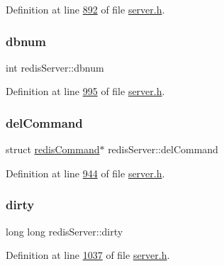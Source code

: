 Definition at line \hyperlink{server_8h_source_l00892}{892} of file \hyperlink{server_8h_source}{server.\+h}.

\mbox{\label{structredisServer_a62d9b4dfd9fa2999fdeafb9756759e40}} 
\subsubsection{\texorpdfstring{dbnum}{dbnum}}
{\footnotesize\ttfamily int redis\+Server\+::dbnum}



Definition at line \hyperlink{server_8h_source_l00995}{995} of file \hyperlink{server_8h_source}{server.\+h}.

\mbox{\label{structredisServer_a124fe2414569e4360d13bf69c0580783}} 
\subsubsection{\texorpdfstring{del\+Command}{delCommand}}
{\footnotesize\ttfamily struct \hyperlink{structredisCommand}{redis\+Command}$\ast$ redis\+Server\+::del\+Command}



Definition at line \hyperlink{server_8h_source_l00944}{944} of file \hyperlink{server_8h_source}{server.\+h}.

\mbox{\label{structredisServer_a3e6b5cbb6723ee5e2173ff513e0d1958}} 
\subsubsection{\texorpdfstring{dirty}{dirty}}
{\footnotesize\ttfamily long long redis\+Server\+::dirty}



Definition at line \hyperlink{server_8h_source_l01037}{1037} of file \hyperlink{server_8h_source}{server.\+h}.

\mbox{\label{structredisServer_a2134f6b1463d32563c7c65dbec6bd062}} 
